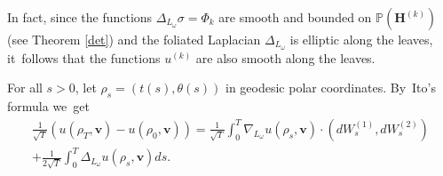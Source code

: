 \documentclass[JEP,XML,SOM,Unicode,published]{cedram}
\theoremstyle{plain}
\theoremstyle{definition}
\numberwithin{equation}{subsection}
\newcommand\bP{\mathbb{P}}
\let\gradient\nabla
\let\laplacian\Delta
\newcommand{\bfH}{\boldsymbol{H}}
\newcommand{\bfv}{\boldsymbol{v}}
\begin{document}
In fact, since the functions $\laplacian_{L_\omega} \sigma = \Phi_k$ are smooth and bounded on $\bP(\bfH^{(k)})$ (see Theorem \ref{det}) and the foliated Laplacian $\laplacian_{L_\omega}$ is elliptic along the leaves, it~follows that the functions $u^{(k)}$ are also smooth along the leaves.

For all $s>0$, let $\rho_s = (t(s), \theta(s))$ in geodesic polar coordinates. By~Ito's formula we~get\vspace*{-5pt}
\begin{multline*}
\frac{1}{\sqrt{T}}(u(\rho_T,\bfv)-u(\rho_0,\bfv)) = \frac{1}{\sqrt{T}}\int_0^T \gradient_{L_\omega} u(\rho_s,\bfv) \cdot (dW^{(1)}_s,dW^{(2)}_s) \\[-5pt]
+ \frac{1}{2\sqrt{T}} \int_0^T \laplacian_{L_\omega} u(\rho_s, \bfv) ds.
\end{multline*}
\end{document}
